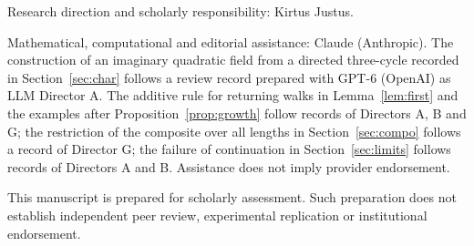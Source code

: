 \documentclass[11pt,a4paper]{article}
\begin{document}
\begin{titlepage}
\vfill
{\small Research direction and scholarly responsibility: Kirtus Justus.\par
Mathematical, computational and editorial assistance: Claude (Anthropic).
The construction of an imaginary quadratic field from a directed three-cycle recorded in Section~\ref{sec:char} follows a review record prepared with GPT-6 (OpenAI) as LLM Director A. The additive rule for returning walks in Lemma~\ref{lem:first} and the examples after Proposition~\ref{prop:growth} follow records of Directors A, B and G; the restriction of the composite over all lengths in Section~\ref{sec:compo} follows a record of Director G; the failure of continuation in Section~\ref{sec:limits} follows records of Directors A and B.
Assistance does not imply provider endorsement.\par
This manuscript is prepared for scholarly assessment. Such preparation does not establish independent peer review,
experimental replication or institutional endorsement.\par}
\end{titlepage}
\setcounter{page}{2}

\clearpage
\end{document}
